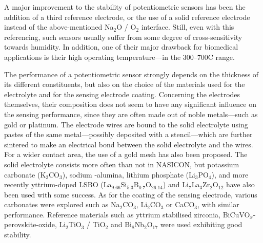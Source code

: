 A major improvement to the stability of potentiometric sensors has been the addition of a third reference electrode\cite{maruyama1987, kishi2007, dang2013}, or the use of a solid reference electrode instead of the above-mentioned Na$_2$O / O$_2$ interface\cite{lee2009li, lee2014, lee2015hk}. Still, even with this referencing, such sensors usually suffer from some degree of cross-sensitivity towards humidity. In addition, one of their major drawback for biomedical applications is their high operating temperature---in the 300--700{\degree}C range.

The performance of a potentiometric sensor strongly depends on the thickness of its different constituents, but also on the choice of the materials used for the electrolyte and for the sensing electrode coating. Concerning the electrodes themselves, their composition does not seem to have any significant influence on the sensing performance, since they are often made out of noble metals---such as gold\cite{maruyama1987, obata2003, kishi2007} or platinum\cite{gauthier1977, kida2001, dang2013}. The electrode wires are bound to the solid electrolyte using pastes of the same metal---possibly deposited with a stencil---which are further sintered to make an electrical bond between the solid electrolyte and the wires. For a wider contact area, the use of a gold mesh has also been proposed\cite{obata2003}. The solid electrolyte consists more often than not in NASICON, but potassium carbonate (K$_2$CO$_3$)\cite{gauthier1977}, sodium \beta-alumina\cite{liu1990}, lithium phosphate (Li$_3$PO$_4$)\cite{lee2009li, lee2014, lee2015hk}, and more recently yttrium-doped LSBO (La$_{9.66}$Si$_{5.3}$B$_{0.7}$O$_{26.14}$)\cite{ma2020} and Li$_7$La$_3$Zr$_2$O$_12$\cite{struzik2018} have also been used with some success. As for the coating of the sensing electrode, various carbonates were explored such as Na$_2$CO$_3$, Li$_2$CO$_3$ or CaCO$_3$, with similar performance. Reference materials such as yttrium stabilised zirconia\cite{maruyama1987}, BiCuVO$_x$-perovskite-oxide\cite{kishi2007}, Li$_2$TiO$_3$ / TiO$_2$\cite{lee2009li, lee2014, lee2015hk} and Bi$_8$Nb$_2$O$_{17}$\cite{dang2013} were used exhibiting good stability.

